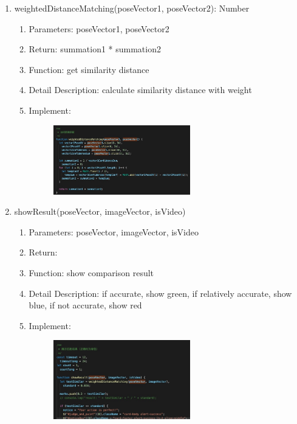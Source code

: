 \documentclass[16pt]{scrreprt}
\begin{document}
\begin{enumerate}
    \item weightedDistanceMatching(poseVector1, poseVector2): Number
        \begin{enumerate}
            \item Parameters: poseVector1, poseVector2
            \item Return: summation1 * summation2
            \item Function: get similarity distance
            \item Detail Description: calculate similarity distance with weight
            \item Implement:
                \begin{figure}[H]
                    \centering
                    \includegraphics[width=0.6\textwidth]{diagrams/comparison-3.jpg}\\
                \end{figure}
        \end{enumerate}

    \item showResult(poseVector, imageVector, isVideo)
        \begin{enumerate}
            \item Parameters: poseVector, imageVector, isVideo
            \item Return: 
            \item Function: show comparison result
            \item Detail Description: if accurate, show green, if relatively accurate, show blue, if not accurate, show red
            \item Implement:
                \begin{figure}[H]
                    \centering
                    \includegraphics[width=0.6\textwidth]{diagrams/comparison-4.jpg}\\
                \end{figure}
        \end{enumerate}
\end{enumerate}
\end{document}

